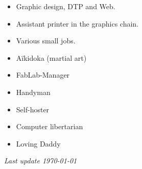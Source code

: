 \documentclass[10pt,a4paper,ragged2e,withhyper,normalphoto]{altacv}
\begin{document}
\begin{paracol}{2}
\divider

\begin{itemize}
\item Graphic design, DTP and Web.
\end{itemize}

\divider

\begin{itemize}
\item Assistant printer in the graphics chain.
\end{itemize}

\divider

\begin{itemize}
\item Various small jobs.
\end{itemize}

\end{paracol}


\begin{paracol}{2}

\begin{itemize}
\item Aïkidoka (martial art)
\item FabLab-Manager
\item Handyman
\switchcolumn
\item Self-hoster
\item Computer libertarian
\item Loving Daddy
\end{itemize}

\end{paracol}

\bigskip

\raggedleft
{\textit{Last update \today}}
\end{document}
